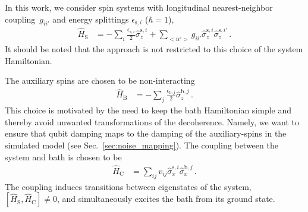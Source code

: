 \documentclass[twocolumn,amsmath,amssymb,pra]{revtex4-2}
\begin{document}
In this work, we consider spin systems with longitudinal nearest-neighbor coupling~$g_{ii'}$ 
and energy splittings $\epsilon_{\textrm{s},i}$ ($\hbar=1$),
\begin{align}
\hat H_\textrm{S} &= -\sum_i \frac{\epsilon_{\textrm{s},i}}{2} \hat \sigma_z^{\textrm{s},i} + \sum_{<ii'>}g_{ii'} \hat\sigma_z^{\textrm{s},i} \hat\sigma_z^{\textrm{s},i'} \, . \label{eq:system_Hamiltonian}
\end{align}
It should be noted that  the approach is not restricted to this choice
of the system Hamiltonian.

The auxiliary spins are chosen to be non-interacting
\begin{align}
\hat H_\textrm{B} &= -\sum_j \frac{\epsilon_{\textrm{b},j}}{2} \hat \sigma_z^{\textrm{b},j} \, . \label{eq:bath_Hamiltonian}
\end{align}
This choice is motivated by the need to keep the bath Hamiltonian simple
and thereby avoid unwanted transformations of the decoherence. Namely,
we want to ensure that qubit damping maps to the damping of the auxiliary-spins in the simulated model (see Sec.~\ref{sec:noise_mapping}).
The coupling between the system and bath is chosen to be
\begin{align}
\hat H_\textrm{C} &= \sum_{ij} v_{ij} \hat \sigma_x^{\textrm{s},i}\hat \sigma_x^{\textrm{b},j}  \, . \label{eq:coupling_Hamiltonian}
\end{align}
The coupling induces transitions between eigenstates of the system, $[\hat{H}_\textrm{S}, \hat{H}_\textrm{C}]\neq 0$,
and simultaneously excites the bath from its ground state.
\end{document}
